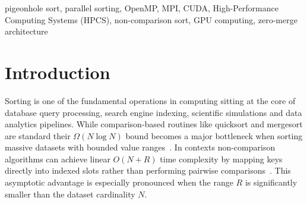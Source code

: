 \documentclass[conference]{IEEEtran}
\begin{document}
\begin{abstract}
Practical sorting algorithms are comparison-based and bounded by $\Omega(N \log N)$ time complexity. For bounded-range integer workloads, non-comparison algorithms like pigeonhole sort can run in linear $O(N + R)$ time. However pigeonhole sort remains largely unexplored in high-performance parallel computing due to stack-overflow vulnerabilities from variable-length arrays and data-race hazards during concurrent histogram updates. In this paper we show a multi-tier parallelization of pigeonhole sort that works across multi-core CPUs distributed MPI clusters and NVIDIA CUDA GPUs. Our framework introduces three optimizations: (1)~a secure heap-allocated baseline that replaces unsafe stack VLAs; (2)~an OpenMP implementation that uses thread-local histograms eliminating lock synchronization; (3)~a zero-merge distributed MPI architecture that splits the value range into separate intervals removing sequential merge overhead; and (4)~a three-kernel CUDA pipeline that uses global grid-stride atomic histogramming and parallel scatter. Evaluated on the IBM Quest transaction benchmark ($N \approx 1{,}010{,}228$ integers, range $[0, 999]$) the CUDA implementation achieves an execution time of 0.42~ms ($5.15\times$ speedup over the 2.16~ms baseline) followed by MPI with 4 processes at 0.72~ms ($3.01\times$) and OpenMP with 4 threads at 1.00~ms ($2.16\times$). The MPI implementation reaches 90.0\% efficiency using two processes. All configurations were verified with monotonicity assertions. These results show pigeonhole sort as a practical and scalable method for bounded-range integer sorting on diverse parallel systems.
\end{abstract}

\begin{IEEEkeywords}
pigeonhole sort, parallel sorting, OpenMP, MPI, CUDA, High-Performance Computing Systems (HPCS), non-comparison sort, GPU computing, zero-merge architecture
\end{IEEEkeywords}

\section{Introduction}
Sorting is one of the fundamental operations in computing sitting at the core of database query processing, search engine indexing, scientific simulations and data analytics pipelines. While comparison-based routines like quicksort and mergesort are standard their $\Omega(N \log N)$ bound becomes a major bottleneck when sorting massive datasets with bounded value ranges~\cite{yu2022}. In contexts non-comparison algorithms can achieve linear $O(N + R)$ time complexity by mapping keys directly into indexed slots rather than performing pairwise comparisons~\cite{dong2024}. This asymptotic advantage is especially pronounced when the range $R$ is significantly smaller than the dataset cardinality $N$.
\end{document}
